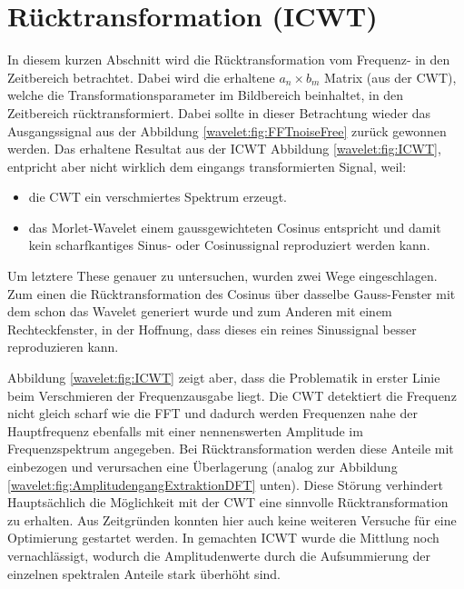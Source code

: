 %
%
%
%
\section{Rücktransformation (ICWT)
\label{wavelets:section:teil5}}

In diesem kurzen Abschnitt wird die Rücktransformation vom Frequenz-
in den Zeitbereich betrachtet.
Dabei wird die erhaltene $a_n \times b_m$ Matrix (aus der CWT),
welche die Transformationsparameter im Bildbereich beinhaltet, in
den Zeitbereich rücktransformiert.
Dabei sollte in dieser Betrachtung wieder das Ausgangssignal aus
der Abbildung \ref{wavelet:fig:FFTnoiseFree} zurück gewonnen werden.
Das erhaltene Resultat aus der ICWT Abbildung \ref{wavelet:fig:ICWT},
entpricht aber nicht wirklich dem eingangs transformierten Signal,
weil:

\begin{itemize}
	\item die CWT ein verschmiertes Spektrum erzeugt.
	\item das Morlet-Wavelet einem gaussgewichteten Cosinus
	entspricht und damit kein scharfkantiges Sinus- oder
	Cosinussignal reproduziert werden kann.
\end{itemize}

Um letztere These genauer zu untersuchen, wurden zwei Wege eingeschlagen.
Zum einen die Rücktransformation des Cosinus über dasselbe Gauss-Fenster
mit dem schon das Wavelet generiert wurde und zum Anderen mit einem
Rechteckfenster, in der Hoffnung, dass dieses ein reines Sinussignal
besser reproduzieren kann.

Abbildung \ref{wavelet:fig:ICWT} zeigt aber, dass die Problematik
in erster Linie beim Verschmieren der Frequenzausgabe liegt.
Die CWT detektiert die Frequenz nicht gleich scharf wie die FFT und
dadurch werden Frequenzen nahe der Hauptfrequenz ebenfalls mit einer
nennenswerten Amplitude im Frequenzspektrum angegeben.
Bei Rücktransformation werden diese Anteile mit einbezogen und
verursachen eine Überlagerung (analog zur Abbildung
\ref{wavelet:fig:AmplitudengangExtraktionDFT} unten).
Diese Störung verhindert Hauptsächlich die Möglichkeit mit der CWT eine sinnvolle Rücktransformation zu erhalten.
Aus Zeitgründen konnten hier auch keine weiteren Versuche für eine
Optimierung gestartet werden.
In gemachten ICWT wurde die Mittlung noch vernachlässigt, wodurch
die Amplitudenwerte durch die Aufsummierung der einzelnen spektralen
Anteile stark überhöht sind.

